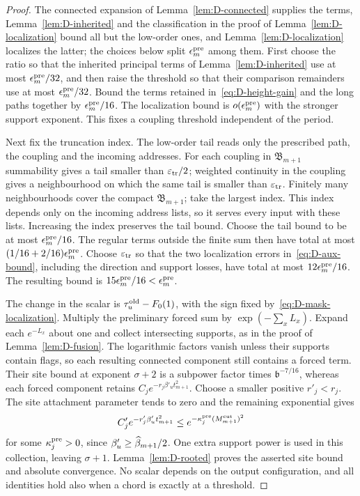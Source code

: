 \begin{proof}
The connected expansion of Lemma~\ref{lem:D-connected} supplies the terms, Lemma~\ref{lem:D-inherited} and the classification in the proof of Lemma~\ref{lem:D-localization} bound all but the low-order ones, and Lemma~\ref{lem:D-localization} localizes the latter; the choices below split $\epsilon^{\rm pre}_m$ among them. First choose the ratio so that the inherited principal terms of Lemma~\ref{lem:D-inherited} use at most $\epsilon^{\rm pre}_m/32$, and then raise the threshold so that their comparison remainders use at most $\epsilon^{\rm pre}_m/32$. Bound the terms retained in~\eqref{eq:D-height-gain} and the long paths together by $\epsilon^{\rm pre}_m/16$. The localization bound is $o(\epsilon^{\rm pre}_m)$ with the stronger support exponent. This fixes a coupling threshold independent of the period.

Next fix the truncation index. The low-order tail reads only the prescribed path, the coupling and the incoming addresses. For each coupling in $\mathfrak B_{m+1}$ summability gives a tail smaller than $\varepsilon_{\rm tr}/2$; weighted continuity in the coupling gives a neighbourhood on which the same tail is smaller than $\varepsilon_{\rm tr}$. Finitely many neighbourhoods cover the compact $\mathfrak B_{m+1}$; take the largest index. This index depends only on the incoming address lists, so it serves every input with these lists. Increasing the index preserves the tail bound. Choose the tail bound to be at most $\epsilon^{\rm pre}_m/16$. The regular terms outside the finite sum then have total at most $(1/16+2/16)\epsilon^{\rm pre}_m$. Choose $\varepsilon_{\rm tr}$ so that the two localization errors in~\eqref{eq:D-aux-bound}, including the direction and support losses, have total at most $12\epsilon^{\rm pre}_m/16$. The resulting bound is $15\epsilon^{\rm pre}_m/16<\epsilon^{\rm pre}_m$.

The change in the scalar is $\tau_u^{\rm old}-F_0(1)$, with the sign fixed by~\eqref{eq:D-mask-localization}. Multiply the preliminary forced sum by $\exp(-\sum_xL_x)$. Expand each $e^{-L_x}$ about one and collect intersecting supports, as in the proof of Lemma~\ref{lem:D-fusion}. The logarithmic factors vanish unless their supports contain flags, so each resulting connected component still contains a forced term. Their site bound at exponent $\sigma+2$ is a subpower factor times $\mathfrak b^{-7/16}$, whereas each forced component retains $C_j e^{-r_j\beta'_u t_{m+1}^2}$. Choose a smaller positive $r'_j<r_j$. The site attachment parameter tends to zero and the remaining exponential gives
\begin{equation*}
C'_j e^{-r'_j\beta'_u t_{m+1}^2}
\le e^{-\kappa_j^{\rm pre}(M^{\mathrm{cut}}_{m+1})^2}
\end{equation*}
for some $\kappa_j^{\rm pre}>0$, since $\beta'_u\ge\widehat{\beta}_{m+1}/2$. One extra support power is used in this collection, leaving $\sigma+1$. Lemma~\ref{lem:D-rooted} proves the asserted site bound and absolute convergence. No scalar depends on the output configuration, and all identities hold also when a chord is exactly at a threshold.


\end{proof}
